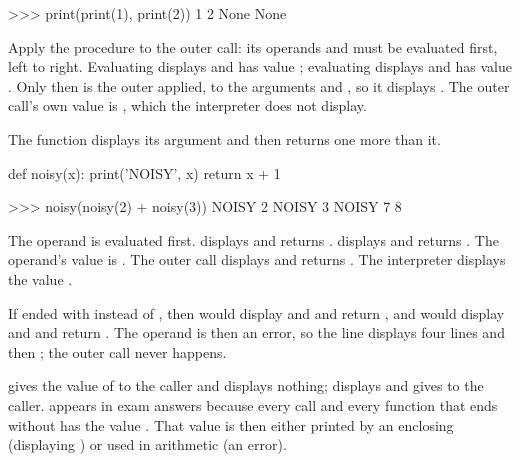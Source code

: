 \documentclass[10pt]{scrartcl}
\begin{document}
\begin{example*}
\begin{py}
>>> print(print(1), print(2))
1
2
None None
\end{py}
Apply the procedure to the outer call: its operands  and  must be evaluated first, left to right. Evaluating  displays  and has value ; evaluating  displays  and has value . Only then is the outer  applied, to the arguments  and , so it displays . The outer call's own value is , which the interpreter does not display.
\end{example*}

\begin{example*}
The function  displays its argument and then returns one more than it.
\begin{py}
def noisy(x):
    print('NOISY', x)
    return x + 1

>>> noisy(noisy(2) + noisy(3))
NOISY 2
NOISY 3
NOISY 7
8
\end{py}
\begin{steps}
  \ii The operand  is evaluated first.  displays  and returns .
  \ii {} displays  and returns . The operand's value is .
  \ii The outer call  displays  and returns .
  \ii The interpreter displays the value .
\end{steps}
\end{example*}

\begin{example*}
If  ended with  instead of , then  would display  and  and return , and  would display  and  and return . The operand \mbox{} is then an error, so the line displays four lines and then ; the outer call never happens.
\end{example*}

\revisit {} gives the value of  to the caller and displays nothing;  displays  and gives  to the caller.  appears in exam answers because every  call and every function that ends without  has the value . That value is then either printed by an enclosing  (displaying ) or used in arithmetic (an error).
\end{document}
